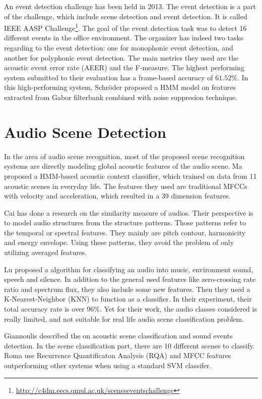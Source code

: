 An event detection challenge has been held in 2013. 
The event detection is a part of the challenge, which include scene detection and event detection.  
It is called IEEE AASP Challenge\footnote{\url{http://c4dm.eecs.qmul.ac.uk/sceneseventschallenge}}. 
The goal of the event detection task was to detect 16 different events in the office environment. 
The organizer has indeed two tasks regarding to the event detection: one for monophonic event detection, and another for polyphonic event detection.  
The main metrics they used are the acoustic event error rate (AEER) \cite{giannoulis2013ieee} and the F-measure.
The highest performing system submitted to their evaluation has a frame-based accuracy of $61.52\%$. 
In this high-performing system, Schr\"{o}der \et \cite{schroder2013acoustic} proposed a HMM model on features extracted from Gabor filterbank combined with noise suppresion technique. 

\section{Audio Scene Detection}
In the area of audio scene recognition, most of the proposed scene recognition systems are directly modeling global acoustic features of the audio scene. 
Ma \et \cite{ma2006acoustic} proposed a HMM-based acoustic context classifier, which trained on data from 11 acoustic scenes in everyday life. 
The features they used are traditional MFCCs with velocity and acceleration, which resulted in a 39 dimension features. 

Cai \et \cite{cai03usingstrcture} has done a research on the similarity measure of audios. 
Their perspective is to model audio structures from the structure patterns. 
Those patterns refer to the temporal or spectral features. 
They mainly are pitch contour, harmonicity and energy envelope. 
Using these patterns, they avoid the problem of only utilizing averaged features. 

Lu \et \cite{lu2001robust} proposed a algorithm for classifying an audio into music, environment sound, speech and silence. 
In addition to the general used features like zero-crossing rate ratio and spectrum flux, they also include some new features. 
Then they used a K-Nearest-Neighbor (KNN) to function as a classifier. 
In their experiment, their total accuracy rate is over 96$\%$. 
Yet for their work, the audio classes considered is really limited, and not suitable for real life audio scene classification problem.  

Giannoulis \et \cite{giannoulis2013applications} described the on acoustic scene classification and sound events detection.  
In the scene classification part, there are 10 different scenes to classify. 
Roma \et \cite{romarecurrence} use Recurrence Quantificaton Analysis (RQA) and MFCC features outperforming other systems when using a standard SVM classifer. 

